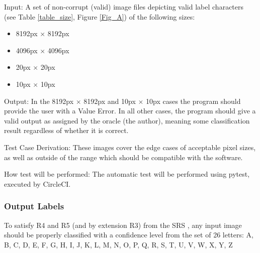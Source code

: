 \documentclass[12pt, titlepage]{article}
\begin{document}
\begin{enumerate}
  Input: A set of non-corrupt (valid) image files depicting valid label characters (see Table \ref{table_size}, Figure \ref{Fig_A}) of the following sizes:
  \begin{itemize}
    \item{8192px $\times$ 8192px}
    \item{4096px $\times$ 4096px}
    \item{20px $\times$ 20px}
    \item{10px $\times$ 10px}
  \end{itemize}
            
  Output: In the 8192px $\times$ 8192px and 10px $\times$ 10px cases the program should provide the user with a Value Error. In all other cases,
  the program should give a valid output as assigned by the oracle (the author), meaning some classification result regardless
  of whether it is correct.
            
  Test Case Derivation: These images cover the edge cases of acceptable pixel sizes, as well as outside of the range which should be compatible with the software.
            
  How test will be performed: The automatic test will be performed using pytest, executed by CircleCI.

\end{enumerate}

\subsubsection{Output Labels}

To satisfy R4 and R5 (and by extension R3) from the SRS \citep{SRS}, any input image should be properly classified with a confidence level from the set of 26 letters: {A, B, C, D, E, F, G, H, I, J, K, L, M, N, O, P, Q, R, S, T, U, V, W, X, Y, Z}
\end{document}
